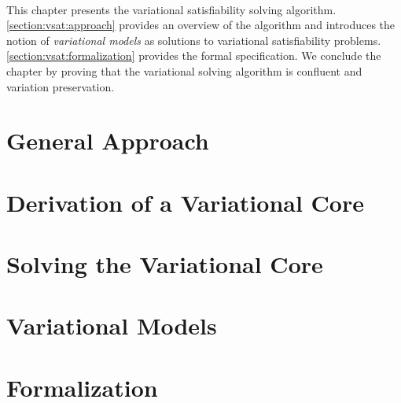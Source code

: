 ~\label{chapter:vsat}

This chapter presents the variational satisfiability solving algorithm.
\autoref{section:vsat:approach} provides an overview of the algorithm and
introduces the notion of \emph{variational models} as solutions to variational
satisfiability problems. \autoref{section:vsat:formalization} provides the
formal specification. We conclude the chapter by proving that the variational solving
algorithm is confluent and variation preservation.

\section{General Approach}


\section{Derivation of a Variational Core}


\section{Solving the Variational Core}


\section{Variational Models}


\section{Formalization}


